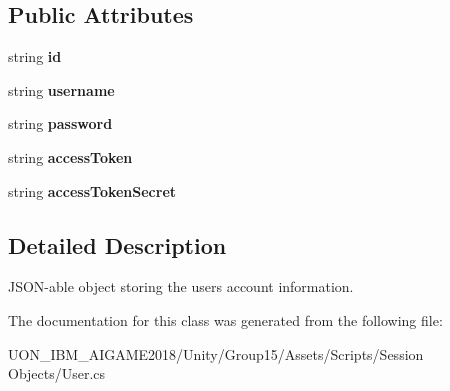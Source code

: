 \subsection*{Public Attributes}
\begin{DoxyCompactItemize}
\item 
\mbox{\label{class_user_aeec50df41e3fc646fbf1ddf3a825fe49}} 
string {\bfseries id}
\item 
\mbox{\label{class_user_a31bab5f53b917b7253a3210123eacf7b}} 
string {\bfseries username}
\item 
\mbox{\label{class_user_a114fb9fd8c0362bd1298c6248ca68f5d}} 
string {\bfseries password}
\item 
\mbox{\label{class_user_ac76de605e6cf755236947a31e98a6de9}} 
string {\bfseries access\+Token}
\item 
\mbox{\label{class_user_a79b7e9fe1c8c513722b937d961e5190c}} 
string {\bfseries access\+Token\+Secret}
\end{DoxyCompactItemize}


\subsection{Detailed Description}
J\+S\+O\+N-\/able object storing the user\textquotesingle{}s account information. 

The documentation for this class was generated from the following file\+:\begin{DoxyCompactItemize}
\item 
U\+O\+N\+\_\+\+I\+B\+M\+\_\+\+A\+I\+G\+A\+M\+E2018/\+Unity/\+Group15/\+Assets/\+Scripts/\+Session Objects/User.\+cs\end{DoxyCompactItemize}
